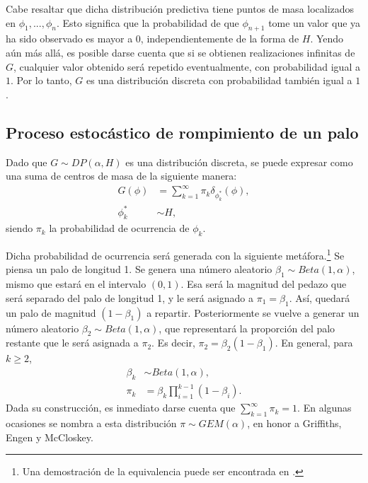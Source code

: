 Cabe resaltar que dicha distribuci\'on predictiva tiene puntos de masa localizados en $\phi_1,...,\phi_n$. Esto significa que la probabilidad de que $\phi_{n+1}$ tome un valor que ya ha sido observado es mayor a $0$, independientemente de la forma de $H$. Yendo a\'un m\'as all\'a, es posible darse cuenta que si se obtienen realizaciones infinitas de $G$, cualquier valor obtenido ser\'a repetido eventualmente, con probabilidad igual a $1$. Por lo tanto, $G$ es una distribuci\'on discreta con probabilidad tambi\'en igual a $1$.

\subsection{Proceso estoc\'astico de rompimiento de un palo}

Dado que $G \sim DP(\alpha,H)$  es una distribuci\'on discreta, se puede expresar como una suma de centros de masa de la siguiente manera:
\begin{equation*}
\begin{aligned}
G(\phi) &= \sum_{k=1}^\infty \pi_k \delta_{\phi_k^*}(\phi),\\
   \phi_k^* &\sim H,
\end{aligned}
\end{equation*}
siendo $\pi_k$ la probabilidad de ocurrencia de $\phi_k$.

Dicha probabilidad de ocurrencia ser\'a generada con la siguiente met\'afora.\footnote{Una demostraci\'on de la equivalencia puede ser encontrada en \cite{Paisley_SB}.} Se piensa un palo de longitud 1. Se genera una n\'umero aleatorio $\beta_1 \sim Beta(1,\alpha)$, mismo que estar\'a en el intervalo $(0,1)$. Esa ser\'a la magnitud del pedazo que ser\'a separado del palo de longitud 1, y le ser\'a asignado a $\pi_1 = \beta_1$. As\'i, quedar\'a un palo de magnitud $(1-\beta_1)$ a repartir. Posteriormente se vuelve a generar un n\'umero aleatorio $\beta_2 \sim Beta(1,\alpha)$, que representar\'a la proporci\'on del palo restante que le ser\'a asignada a $\pi_2$. Es decir, $\pi_2 = \beta_2(1-\beta_1)$. En general, para $k \geq 2$,
\begin{equation*}
\begin{aligned}
   \beta_k &\sim Beta(1,\alpha),\\
   \pi_k &= \beta_k \prod_{i=1}^{k-1}(1 - \beta_i).
\end{aligned}
\end{equation*}
Dada su construcci\'on, es inmediato darse cuenta que $\sum_{k=1}^\infty \pi_k = 1$. En algunas ocasiones se nombra a esta distribuci\'on $\pi \sim GEM(\alpha)$, en honor a Griffiths, Engen y McCloskey.

